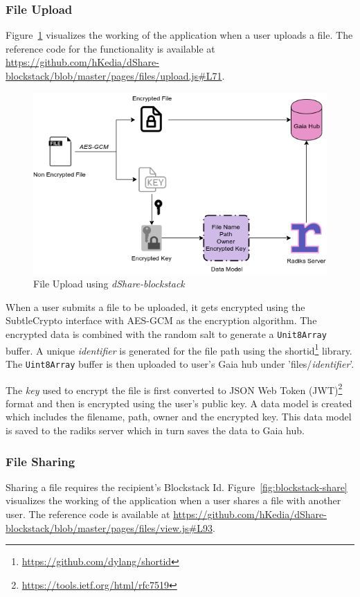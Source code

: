 			\subsubsection{File Upload}
				Figure~\ref{fig:blockstack-upload} visualizes the working of the application when a user uploads a file. The reference code for the functionality is available at \url{https://github.com/hKedia/dShare-blockstack/blob/master/pages/files/upload.js#L71}.
				
				\begin{figure}[h]
					\includegraphics[width=\linewidth]{figures/blockstack-upload}
					\caption{\label{fig:blockstack-upload} File Upload using \textit{dShare-blockstack}}
				\end{figure}
		
				When a user submits a file to be uploaded, it gets encrypted using the SubtleCrypto interface with AES-GCM as the encryption algorithm. The encrypted data is combined with the random salt to generate a \texttt{Unit8Array} buffer. A unique \textit{identifier} is generated for the file path using the shortid\footnote{\url{https://github.com/dylang/shortid}} library. The \texttt{Uint8Array} buffer is then uploaded to user's Gaia hub under 'files/{\textit{identifier}}'.
				
				The \textit{key} used to encrypt the file is first converted to JSON Web Token (JWT)\footnote{\url{https://tools.ietf.org/html/rfc7519}} format and then is encrypted using the user's public key. A data model is created which includes the filename, path, owner and the encrypted key. This data model is saved to the radiks server which in turn saves the data to Gaia hub.
			
			\subsubsection{File Sharing}
				Sharing a file requires the recipient's Blockstack Id. Figure~\ref{fig:blockstack-share} visualizes the working of the application when a user shares a file with another user. The reference code is available at \url{https://github.com/hKedia/dShare-blockstack/blob/master/pages/files/view.js#L93}.
			
